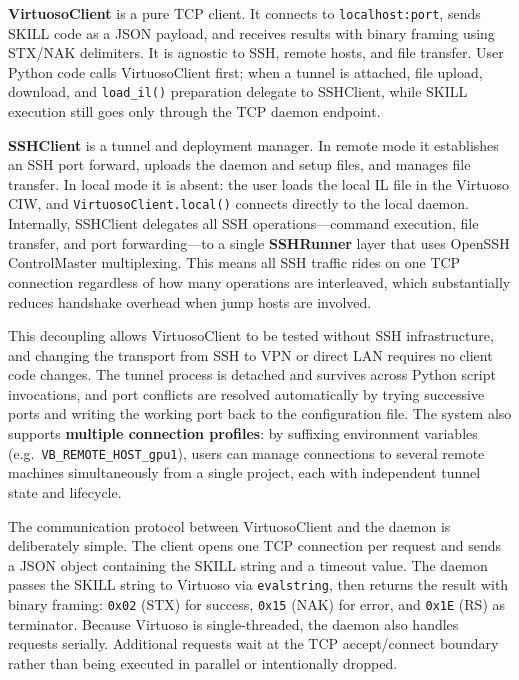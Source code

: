 \documentclass[lettersize,journal]{ieee_template/IEEEtran}
\begin{document}
\textbf{VirtuosoClient} is a pure TCP client. It connects to \texttt{localhost:port}, sends SKILL code as a JSON payload, and receives results with binary framing using STX/NAK delimiters. It is agnostic to SSH, remote hosts, and file transfer. User Python code calls VirtuosoClient first; when a tunnel is attached, file upload, download, and \texttt{load\_il()} preparation delegate to SSHClient, while SKILL execution still goes only through the TCP daemon endpoint.

\textbf{SSHClient} is a tunnel and deployment manager. In remote mode it establishes an SSH port forward, uploads the daemon and setup files, and manages file transfer. In local mode it is absent: the user loads the local IL file in the Virtuoso CIW, and \texttt{VirtuosoClient.local()} connects directly to the local daemon. Internally, SSHClient delegates all SSH operations---command execution, file transfer, and port forwarding---to a single \textbf{SSHRunner} layer that uses OpenSSH ControlMaster multiplexing. This means all SSH traffic rides on one TCP connection regardless of how many operations are interleaved, which substantially reduces handshake overhead when jump hosts are involved.

This decoupling allows VirtuosoClient to be tested without SSH infrastructure, and changing the transport from SSH to VPN or direct LAN requires no client code changes. The tunnel process is detached and survives across Python script invocations, and port conflicts are resolved automatically by trying successive ports and writing the working port back to the configuration file. The system also supports \textbf{multiple connection profiles}: by suffixing environment variables (e.g.\ \texttt{VB\_REMOTE\_HOST\_gpu1}), users can manage connections to several remote machines simultaneously from a single project, each with independent tunnel state and lifecycle.

The communication protocol between VirtuosoClient and the daemon is deliberately simple. The client opens one TCP connection per request and sends a JSON object containing the SKILL string and a timeout value. The daemon passes the SKILL string to Virtuoso via \texttt{evalstring}, then returns the result with binary framing: \texttt{0x02} (STX) for success, \texttt{0x15} (NAK) for error, and \texttt{0x1E} (RS) as terminator. Because Virtuoso is single-threaded, the daemon also handles requests serially. Additional requests wait at the TCP accept/connect boundary rather than being executed in parallel or intentionally dropped.
\end{document}
